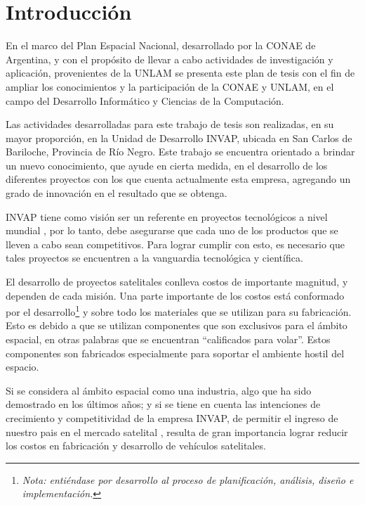 \chapter{Introducción}\label{chap:intro}
En el marco del Plan Espacial Nacional, desarrollado por la \ac{CONAE} de Argentina, y con el propósito de llevar a cabo actividades de investigación y 
aplicación, provenientes de la \ac{UNLAM} se presenta este plan de tesis con el fin de ampliar los 
conocimientos y la participación de la \ac{CONAE} y \ac{UNLAM}, en el campo del Desarrollo Informático y 
Ciencias de la Computación.

Las actividades desarrolladas para este trabajo de tesis son realizadas, en su mayor proporción, en 
la Unidad de Desarrollo \ac{INVAP}, ubicada en San Carlos de Bariloche, Provincia de Río Negro. Este 
trabajo se encuentra orientado a brindar un nuevo conocimiento, que ayude en cierta medida, en el 
desarrollo de los diferentes proyectos con los que cuenta actualmente esta empresa, agregando un 
grado de innovación en el resultado que se obtenga.

\ac{INVAP} tiene como visión ser un referente en proyectos tecnológicos a nivel mundial \cite{invapWEB}, 
por lo tanto, debe asegurarse que cada uno de los productos que se lleven a cabo sean competitivos. 
Para lograr cumplir con esto, es necesario que tales proyectos se encuentren a la vanguardia 
tecnológica y científica.  

El desarrollo de proyectos satelitales conlleva costos de importante magnitud, y 
dependen de cada misión. Una parte importante de los costos está conformado por el 
desarrollo\footnote{\textit{Nota: entiéndase por desarrollo al proceso de planificación, análisis, 
diseño e implementación.}} y sobre todo los materiales que se utilizan para su fabricación. Esto 
es debido a que se utilizan componentes que son exclusivos para el ámbito espacial, en otras 
palabras que se encuentran ``calificados para volar''. Estos componentes son fabricados especialmente para soportar el ambiente hostil del espacio.

Si se considera al ámbito espacial como una industria, algo que ha sido demostrado en los últimos 
años; y si se tiene en cuenta las intenciones de crecimiento y competitividad de la empresa INVAP,  de permitir el ingreso de nuestro pais en el mercado satelital \cite{invapWEB}, resulta de gran 
importancia lograr reducir los costos en fabricación y desarrollo de vehículos satelitales.

